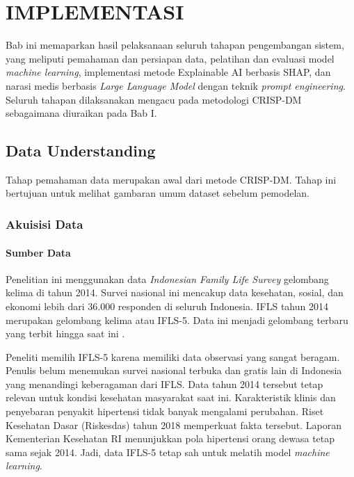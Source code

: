 \cleardoublepage
\chapter{IMPLEMENTASI}
\label{chap:hasil-pembahasan}

Bab ini memaparkan hasil pelaksanaan seluruh tahapan pengembangan sistem, yang meliputi pemahaman dan persiapan data, pelatihan dan evaluasi model \textit{machine learning}, implementasi metode Explainable AI berbasis SHAP, dan narasi medis berbasis \textit{Large Language Model} dengan teknik \textit{prompt engineering}. Seluruh tahapan dilaksanakan mengacu pada metodologi CRISP-DM sebagaimana diuraikan pada Bab I.

\section{Data Understanding}
Tahap pemahaman data merupakan awal dari metode CRISP-DM. Tahap ini bertujuan untuk melihat gambaran umum dataset sebelum pemodelan.

\subsection{Akuisisi Data}
\subsubsection{Sumber Data}
Penelitian ini menggunakan data \textit{Indonesian Family Life Survey} gelombang kelima di tahun 2014. Survei nasional ini mencakup data kesehatan, sosial, dan ekonomi lebih dari 36.000 responden di seluruh Indonesia. IFLS tahun 2014 merupakan gelombang kelima atau IFLS-5. Data ini menjadi gelombang terbaru yang terbit hingga saat ini \autocite{strauss2016ifls5}.

Peneliti memilih IFLS-5 karena memiliki data observasi yang sangat beragam. Penulis belum menemukan survei nasional terbuka dan gratis lain di Indonesia yang menandingi keberagaman dari IFLS. Data tahun 2014 tersebut tetap relevan untuk kondisi kesehatan masyarakat saat ini. Karakteristik klinis dan penyebaran penyakit hipertensi tidak banyak mengalami perubahan. Riset Kesehatan Dasar (Riskesdas) tahun 2018 memperkuat fakta tersebut. Laporan Kementerian Kesehatan RI \autocite{ri2018} menunjukkan pola hipertensi orang dewasa tetap sama sejak 2014. Jadi, data IFLS-5 tetap sah untuk melatih model \textit{machine learning}. 


